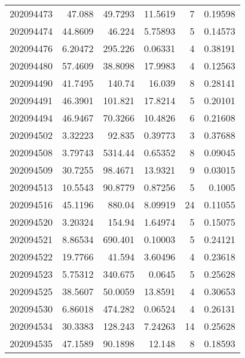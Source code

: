 \begin{tabular}{rrrrrr}
 202094473 &         47.088   &       49.7293 &           11.5619  &           7 & 0.19598 \\
 202094474 &         44.8609  &       46.224  &            5.75893 &           5 & 0.14573 \\
 202094476 &          6.20472 &      295.226  &            0.06331 &           4 & 0.38191 \\
 202094480 &         57.4609  &       38.8098 &           17.9983  &           4 & 0.12563 \\
 202094490 &         41.7495  &      140.74   &           16.039   &           8 & 0.28141 \\
 202094491 &         46.3901  &      101.821  &           17.8214  &           5 & 0.20101 \\
 202094494 &         46.9467  &       70.3266 &           10.4826  &           6 & 0.21608 \\
 202094502 &          3.32223 &       92.835  &            0.39773 &           3 & 0.37688 \\
 202094508 &          3.79743 &     5314.44   &            0.65352 &           8 & 0.09045 \\
 202094509 &         30.7255  &       98.4671 &           13.9321  &           9 & 0.03015 \\
 202094513 &         10.5543  &       90.8779 &            0.87256 &           5 & 0.1005  \\
 202094516 &         45.1196  &      880.04   &            8.09919 &          24 & 0.11055 \\
 202094520 &          3.20324 &      154.94   &            1.64974 &           5 & 0.15075 \\
 202094521 &          8.86534 &      690.401  &            0.10003 &           5 & 0.24121 \\
 202094522 &         19.7766  &       41.594  &            3.60496 &           4 & 0.23618 \\
 202094523 &          5.75312 &      340.675  &            0.0645  &           5 & 0.25628 \\
 202094525 &         38.5607  &       50.0059 &           13.8591  &           4 & 0.30653 \\
 202094530 &          6.86018 &      474.282  &            0.06524 &           4 & 0.26131 \\
 202094534 &         30.3383  &      128.243  &            7.24263 &          14 & 0.25628 \\
 202094535 &         47.1589  &       90.1898 &           12.148   &           8 & 0.18593 \\

\end{tabular}
